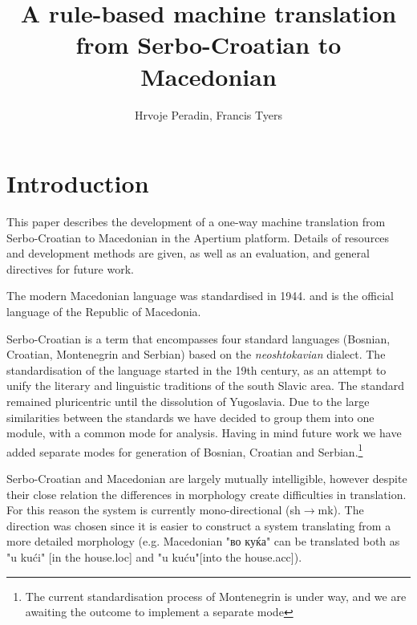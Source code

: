 \documentclass{book}
\title{A rule-based machine translation from Serbo-Croatian to Macedonian}
\author{Hrvoje Peradin, Francis Tyers}
\begin{document}
\frontmatter      %

\maketitle

\setcounter{page}{5}
\setcounter{tocdepth}{0}  %

\chapter{Introduction}

This paper describes the development of a one-way machine translation
from Serbo-Croatian to Macedonian in the Apertium platform.
Details of resources and development methods are given, as well as an
evaluation, and general directives for future work.

The modern Macedonian language was standardised in 1944. and
is the official language of the Republic of Macedonia.

Serbo-Croatian is a term that encompasses four standard languages 
(Bosnian, Croatian, Montenegrin and Serbian) based on the 
\emph{neoshtokavian} dialect. The standardisation of the language started
in the 19th century, as an attempt to unify the literary and linguistic 
traditions of the south Slavic area. The standard remained pluricentric
until the dissolution of Yugoslavia. Due to the large similarities between 
the standards we have decided to group them into one module, with a common
mode for analysis. Having in mind future work we have added separate modes 
for generation of Bosnian, Croatian and Serbian.\footnote{The current standardisation
process of Montenegrin is under way, and we are awaiting the outcome to implement a separate
mode}

Serbo-Croatian and Macedonian are largely mutually intelligible, however despite their close relation the differences in morphology 
create difficulties in translation. For this reason the system is currently mono-directional (sh$\rightarrow$mk). 
The direction was chosen since it is easier to construct a system translating from a more detailed morphology 
(e.g. Macedonian "во куќа" can be translated both as "u kući" [in the house{\sc .loc}] and "u kuću"[into the house{\sc .acc}]).
\end{document}
